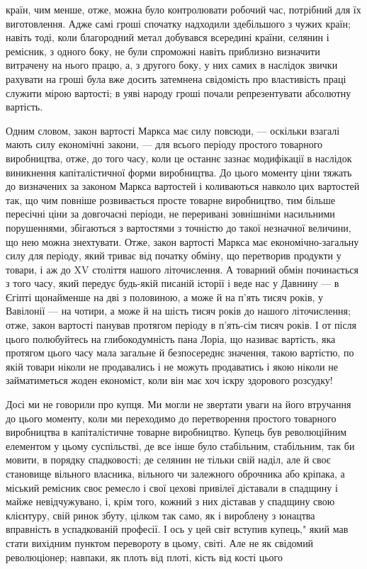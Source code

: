 \parcont{}  %
країн, чим менше, отже, можна було контролювати робочий час, потрібний для їх виготовлення. Адже самі гроші спочатку
надходили здебільшого з чужих країн; навіть тоді, коли благородний метал добувався всередині країни, селянин і ремісник, з
одного боку, не були спроможні навіть приблизно визначити витрачену на нього працю, а, з другого боку, у них самих в
наслідок звички рахувати на гроші була вже досить затемнена свідомість про властивість праці служити мірою вартості; в уяві
народу гроші почали репрезентувати абсолютну вартість.

Одним словом, закон вартості Маркса має силу повсюди, —  оскільки
взагалі мають силу економічні закони, — для всього періоду простого товарного виробництва, отже, до того часу, коли це
останнє зазнає модифікації в наслідок виникнення капіталістичної форми виробництва. До цього моменту ціни тяжать до
визначених за законом Маркса вартостей і коливаються навколо цих вартостей так, що чим повніше розвивається просте товарне
виробництво, тим більше пересічні ціни за довгочасні періоди, не переривані зовнішніми насильними порушеннями, збігаються з
вартостями з точністю до такої незначної величини, що нею можна знехтувати. Отже, закон вартості Маркса має
економічно-загальну силу для періоду, який триває від початку обміну, що перетворив продукти у товари, і аж до XV століття
нашого літочислення. А товарний обмін починається з того часу, який передує будь-якій писаній історії і веде нас у Давнину —
в Єгіпті щонайменше на дві з половиною, а може й на п’ять тисяч років, у Вавілонії — на чотири, а може й на шість тисяч
років до нашого літочислення; отже, закон вартості панував протягом періоду в п’ять-сім тисяч років. І от після цього
полюбуйтесь на глибокодумність пана Лоріа, що називає вартість, яка протягом цього часу мала загальне й безпосереднє
значення, такою вартістю, по якій товари ніколи не продавались і не можуть продаватись і якою ніколи не займатиметься
жоден економіст, коли він має хоч іскру здорового розсудку!

Досі ми не говорили про купця. Ми могли не звертати уваги на його
втручання до цього моменту, коли ми переходимо до перетворення простого товарного виробництва в капіталістичне товарне
виробництво. Купець був революційним елементом у цьому суспільстві, де все інше було стабільним, стабільним, так би мовити,
в порядку спадковості; де селянин не тільки свій наділ, але й своє становище вільного власника, вільного чи залежного
оброчника або кріпака, а міський ремісник своє ремесло і свої цехові привілеї діставали в спадщину і майже невідчужувано, і,
крім того, кожний з них діставав у спадщину свою клієнтуру, свій ринок збуту, цілком так само, як і вироблену з юнацтва
вправність в успадкованій професії. І ось у цей світ вступив купець," який мав стати вихідним пунктом перевороту в цьому,
світі. Але не як свідомий революціонер; навпаки, як плоть від плоті, кість від кості цього
\parbreak{}  %
